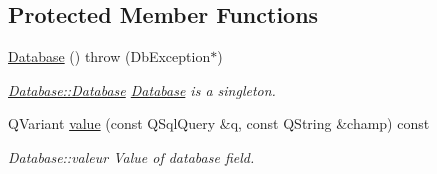 \subsection*{Protected Member Functions}
\begin{DoxyCompactItemize}
\item 
\hypertarget{classDatabases_1_1Database_a7d14f43864ce19a5e399ea4ed3ce808f}{\hyperlink{classDatabases_1_1Database_a7d14f43864ce19a5e399ea4ed3ce808f}{Database} ()  throw (\-Db\-Exception$\ast$)}\label{classDatabases_1_1Database_a7d14f43864ce19a5e399ea4ed3ce808f}

\begin{DoxyCompactList}\small\item\em \hyperlink{classDatabases_1_1Database_a7d14f43864ce19a5e399ea4ed3ce808f}{Database\-::\-Database} \hyperlink{classDatabases_1_1Database}{Database} is a singleton. \end{DoxyCompactList}\item 
Q\-Variant \hyperlink{classDatabases_1_1Database_abac96d2e284c2f13b7fc692994059d74}{value} (const Q\-Sql\-Query \&q, const Q\-String \&champ) const 
\begin{DoxyCompactList}\small\item\em Database\-::valeur Value of database field. \end{DoxyCompactList}\end{DoxyCompactItemize}
